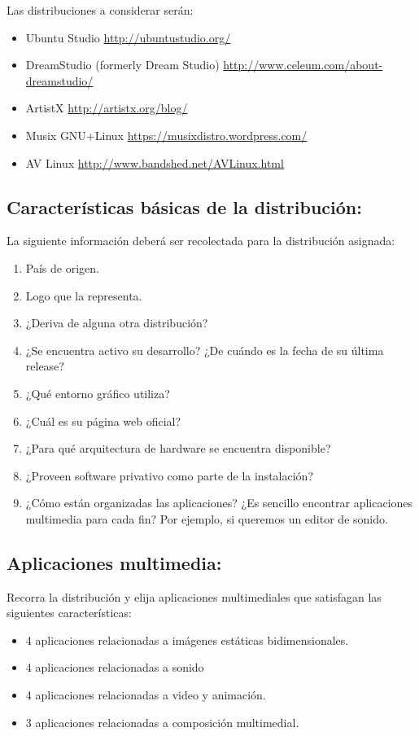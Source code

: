 \documentclass[12pt]{article}
\begin{document}
Las distribuciones a considerar serán: 
\begin{itemize}
\item Ubuntu Studio \url{http://ubuntustudio.org/}
\item DreamStudio (formerly Dream Studio) \url{http://www.celeum.com/about-dreamstudio/}
\item ArtistX \url{http://artistx.org/blog/}
\item Musix GNU+Linux \url{https://musixdistro.wordpress.com/}
\item AV Linux \url{http://www.bandshed.net/AVLinux.html}
\end{itemize}


\subsection*{Características básicas de la distribución:}

La siguiente información deberá ser recolectada para la distribución asignada: 

\begin{enumerate}
\item País de origen. 
\item Logo que la representa. 
\item ¿Deriva de alguna otra distribución? 
\item ¿Se encuentra activo su desarrollo? ¿De cuándo es la fecha de su última release? 
\item ¿Qué entorno gráfico utiliza?
\item ¿Cuál es su página web oficial?
\item ¿Para qué arquitectura de hardware se encuentra disponible?
\item ¿Proveen software privativo como parte de la instalación? 
\item ¿Cómo están organizadas las aplicaciones? ¿Es sencillo encontrar 
aplicaciones multimedia para cada fin? Por ejemplo, si queremos un editor de sonido.
\end{enumerate}

\subsection*{Aplicaciones multimedia:}
Recorra la distribución y elija aplicaciones multimediales que 
satisfagan las siguientes características: 

\begin{itemize}
\item 4 aplicaciones relacionadas a imágenes estáticas bidimensionales. 
\item 4 aplicaciones relacionadas a sonido
\item 4 aplicaciones relacionadas a video y animación.
\item 3 aplicaciones relacionadas a composición multimedial. 
\end{itemize}
\end{document}
